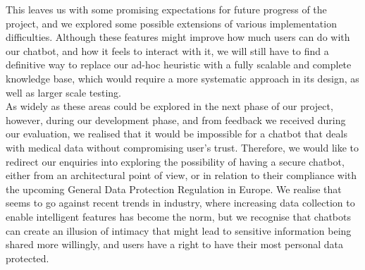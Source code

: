 This leaves us with some promising expectations for future progress of the project, and we explored some possible extensions of various implementation difficulties. Although these features might improve how much users can do with our chatbot, and how it feels to interact with it, we will still have to find a definitive way to replace our ad-hoc heuristic with a fully scalable and complete knowledge base, which would require a more systematic approach in its design, as well as larger scale testing. \\
As widely as these areas could be explored in the next phase of our project, however, during our development phase, and from feedback we received during our evaluation, we realised that it would be impossible for a chatbot that deals with medical data without compromising user's trust. Therefore, we would like to redirect our enquiries into exploring the possibility of having a secure chatbot, either from an architectural point of view, or in relation to their compliance with the upcoming General Data Protection Regulation in Europe. We realise that seems to go against recent trends in industry, where increasing data collection to enable intelligent features has become the norm, but we recognise that chatbots can create an illusion of intimacy that might lead to sensitive information being shared more willingly, and users have a right to have their most personal data protected.
